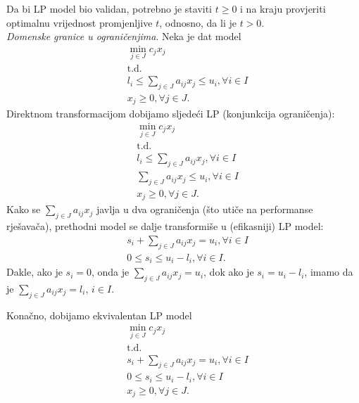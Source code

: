 \documentclass[b5paper, utf8, 11pt, colorlinks]{book}
\theoremstyle{definition}
\begin{document}
Da bi LP model bio validan, potrebno je staviti $t \geq 0$ i na kraju provjeriti optimalnu vrijednost promjenljive $t$, odnosno, da li je $t>0$.   \\
 \emph{Domenske granice u ograničenjima}. Neka je dat model
\begin{align*}
	&\min_{j \in J } c_j x_j \\
	& \mbox{t.d.} \nonumber \\
	& l_i \leq \sum_{j \in J} a_{ij} x_j \leq u_i, \forall i\in I \\
	& x_j \geq 0, \forall j \in J.
\end{align*} 
 Direktnom transformacijom dobijamo sljedeći LP (konjunkcija ograničenja): 
 \begin{align*}
 	& \min_{j \in J } c_j x_j \\
     & \mbox{t.d.} \nonumber \\
  	&  l_i \leq \sum_{j \in J} a_{ij} x_j, \forall i\in I \\
 	&  \sum_{j \in J} a_{ij} x_j \leq u_i, \forall i\in I \\
 	&  x_j \geq 0, \forall j \in J.
 \end{align*}
 Kako    se $\sum_{j \in J} a_{ij} x_j$ javlja u dva ograničenja (što utiče na performanse rješavača), prethodni model se dalje transformiše u (efikasniji) LP model:
 \begin{align*}
 	&s_i + \sum_{j \in J} a_{ij} x_j = u_i, \forall i \in I \\
 	& 0 \leq s_i \leq  u_i - l_i, \forall i \in I.
 \end{align*}
  Dakle, ako je $s_i = 0$, onda je  $\sum_{j \in J} a_{ij} x_j = u_i$, dok ako je  $s_i = u_i - l_i$, imamo da je $\sum_{j \in J} a_{ij} x_j = l_i$, $i\in I$. 

 Konačno, dobijamo ekvivalentan LP model
 \begin{align*}
 	&\min_{j \in J } c_j x_j \\
 	& \mbox{t.d.} \nonumber \\
 	&s_i + \sum_{j \in J} a_{ij} x_j = u_i, \forall i \in I \\ 
 	&  0 \leq s_i \leq  u_i - l_i, \forall i \in I \\
 	& x_j \geq 0, \forall j \in J.
 \end{align*}
\end{document}
